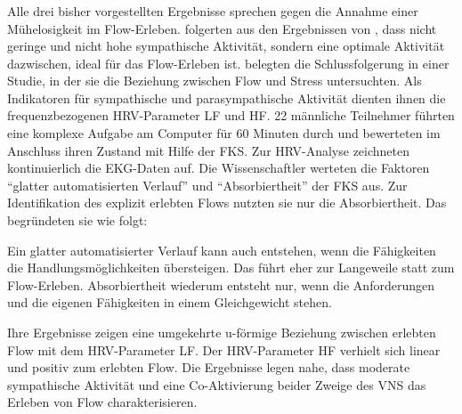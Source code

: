 \subsubsection{\citet{Peifer2014}}
\label{ssub:peifer2014}
Alle drei bisher vorgestellten Ergebnisse sprechen gegen die Annahme einer Mühelosigkeit im Flow-Erleben. \citet{deManzano2010, Peifer2012} folgerten aus den Ergebnissen von \citet{deManzano2010}, dass nicht geringe und nicht hohe sympathische Aktivität, sondern eine optimale Aktivität dazwischen, ideal für das Flow-Erleben ist. \citet{Peifer2014} belegten die Schlussfolgerung in einer Studie, in der sie die Beziehung zwischen Flow und Stress untersuchten. Als Indikatoren für sympathische und parasympathische Aktivität dienten ihnen die frequenzbezogenen \ac{HRV}-Parameter \ac{LF} und \ac{HF}. 22 männliche Teilnehmer führten eine komplexe Aufgabe am Computer für 60 Minuten durch und bewerteten im Anschluss ihren Zustand mit Hilfe der \ac{FKS}. Zur \ac{HRV}-Analyse zeichneten \citet{Peifer2014} kontinuierlich die \ac{EKG}-Daten auf. Die Wissenschaftler werteten die Faktoren "`glatter automatisierten Verlauf"' und "`Absorbiertheit"' der \ac{FKS} aus. Zur Identifikation des explizit erlebten Flows nutzten sie nur die Absorbiertheit. Das begründeten sie wie folgt:

Ein glatter automatisierter Verlauf kann auch entstehen, wenn die Fähigkeiten die Handlungsmöglichkeiten übersteigen. Das führt eher zur Langeweile statt zum Flow-Erleben. Absorbiertheit wiederum entsteht nur, wenn die Anforderungen und die eigenen Fähigkeiten in einem Gleichgewicht stehen.

Ihre Ergebnisse zeigen eine umgekehrte u-förmige Beziehung zwischen erlebten Flow mit dem \ac{HRV}-Parameter \ac{LF}. Der \ac{HRV}-Parameter \ac{HF} verhielt sich linear und positiv zum erlebten Flow. Die Ergebnisse legen nahe, dass moderate sympathische Aktivität und eine Co-Aktivierung beider Zweige des \ac{VNS} das Erleben von Flow charakterisieren.

\subsubsection{\citet{Tozman2015}}

